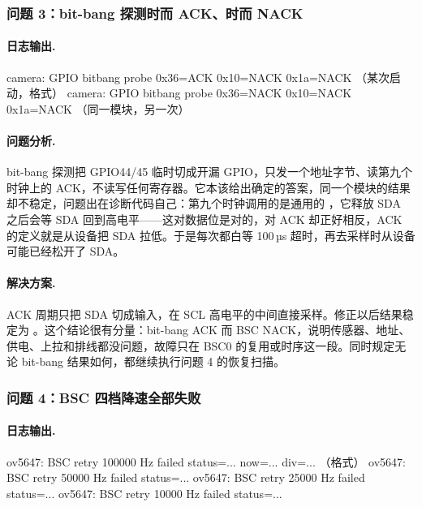 \subsubsection{问题 3：bit-bang 探测时而 ACK、时而 NACK}

\paragraph{日志输出.}
\begin{txtcode}
camera: GPIO bitbang probe 0x36=ACK 0x10=NACK 0x1a=NACK        （某次启动，格式）
camera: GPIO bitbang probe 0x36=NACK 0x10=NACK 0x1a=NACK       （同一模块，另一次）
\end{txtcode}

\paragraph{问题分析.} bit-bang 探测把 GPIO44/45 临时切成开漏 GPIO，只发一个地址字节、读第九个时钟上的 ACK，不读写任何寄存器。它本该给出确定的答案，同一个模块的结果却不稳定，问题出在诊断代码自己：第九个时钟调用的是通用的 ，它释放 SDA 之后会等 SDA 回到高电平——这对数据位是对的，对 ACK 却正好相反，ACK 的定义就是从设备把 SDA 拉低。于是每次都白等 100\,µs 超时，再去采样时从设备可能已经松开了 SDA。

\paragraph{解决方案.} ACK 周期只把 SDA 切成输入，在 SCL 高电平的中间直接采样。修正以后结果稳定为 。这个结论很有分量：bit-bang ACK 而 BSC NACK，说明传感器、地址、供电、上拉和排线都没问题，故障只在 BSC0 的复用或时序这一段。同时规定无论 bit-bang 结果如何，都继续执行问题 4 的恢复扫描。

\subsubsection{问题 4：BSC 四档降速全部失败}

\paragraph{日志输出.}
\begin{txtcode}
ov5647: BSC retry 100000 Hz failed status=... now=... div=...   （格式）
ov5647: BSC retry 50000 Hz failed status=...
ov5647: BSC retry 25000 Hz failed status=...
ov5647: BSC retry 10000 Hz failed status=...
\end{txtcode}

